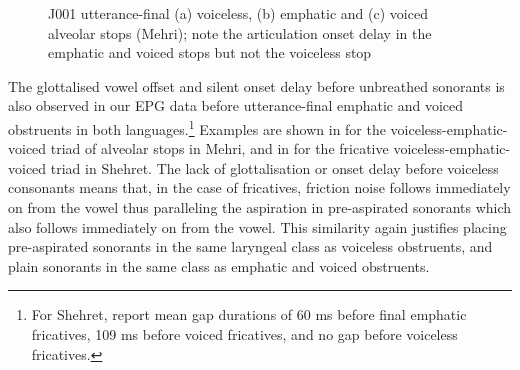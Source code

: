 \documentclass[output=paper]{langscibook}
\begin{document}
\begin{figure}[b]
{}
\caption{J001 utterance-final (a) voiceless, (b) emphatic and (c) voiced alveolar stops (Mehri); note the articulation onset delay in the emphatic and voiced stops but not the voiceless stop}
\label{fig:watson:30}
\end{figure}

The glottalised vowel offset and silent onset delay before unbreathed sonorants is also observed in our EPG data before utterance-final emphatic and voiced obstruents in both languages.\footnote{For Shehret, \citet{HeselwoodEtAl2022} report mean gap durations of 60 ms before final emphatic fricatives, 109 ms before voiced fricatives, and no gap before voiceless fricatives.} Examples are shown in  for the voiceless\hyp emphatic\hyp voiced triad of alveolar stops in Mehri, and in  for the fricative voiceless-emphatic-voiced triad in Shehret. The lack of glottalisation or onset delay before voiceless consonants means that, in the case of fricatives, friction noise follows immediately on from the vowel thus paralleling the aspiration in pre-aspirated sonorants which also follows immediately on from the vowel. This similarity again justifies placing pre-aspirated sonorants in the same laryngeal class as voiceless obstruents, and plain sonorants in the same class as emphatic and voiced obstruents.
\end{document}
